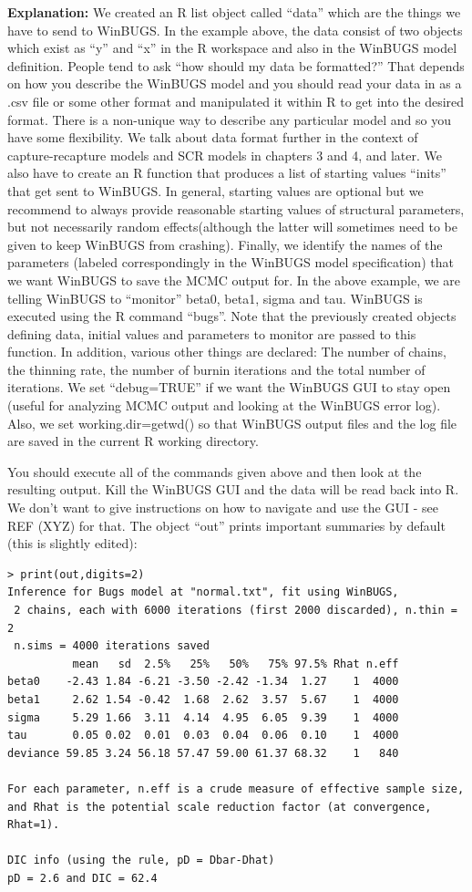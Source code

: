 {\bf Explanation:} We created an R list object called ``data'' which are the things we have to send to WinBUGS.  In the example above, the data consist of two objects which exist as ``y'' and ``x'' in the R workspace and also in the WinBUGS model definition.  People tend to ask ``how should my data be formatted?'' That depends on how you describe the WinBUGS model and you should read your data in as a .csv file or some other format and manipulated it within R to get into the desired format. There is a non-unique way to describe any particular model and so you have some flexibility. We talk about data format further in the context of capture-recapture models and SCR models in chapters 3 and 4, and later.  We also have to create an R function that produces a list of starting values ``inits'' that get sent to WinBUGS. In general, starting values are optional but we recommend to always provide reasonable starting values of structural parameters, but not necessarily random effects(although the latter will sometimes need to be given to keep WinBUGS from crashing).  Finally, we identify the names of the parameters (labeled correspondingly in the WinBUGS model specification) that we want WinBUGS to save the MCMC output for. In the above example, we are telling WinBUGS to ``monitor'' beta0, beta1, sigma and tau. WinBUGS is executed using the R command ``bugs''. Note that the previously created objects defining data, initial values and parameters to monitor are passed to this function. In addition, various other things are declared: The number of chains, the thinning rate, the number of burnin iterations and the total number of iterations. We set ``debug=TRUE'' if we want the WinBUGS GUI to stay open (useful for analyzing MCMC output and looking at the WinBUGS error log). Also, we set working.dir=getwd() so that WinBUGS output files and the log file are saved in the current R working directory.


You should execute all of the commands given above and then look at the resulting output. Kill the WinBUGS GUI and the data will be read back into R.  We don't want to give instructions on how to navigate and use the GUI - see REF (XYZ) for that.  The object ``out'' prints important summaries by default (this is slightly edited):

\begin{verbatim}
> print(out,digits=2)
Inference for Bugs model at "normal.txt", fit using WinBUGS,
 2 chains, each with 6000 iterations (first 2000 discarded), n.thin = 2
 n.sims = 4000 iterations saved
          mean   sd  2.5%   25%   50%   75% 97.5% Rhat n.eff
beta0    -2.43 1.84 -6.21 -3.50 -2.42 -1.34  1.27    1  4000
beta1     2.62 1.54 -0.42  1.68  2.62  3.57  5.67    1  4000
sigma     5.29 1.66  3.11  4.14  4.95  6.05  9.39    1  4000
tau       0.05 0.02  0.01  0.03  0.04  0.06  0.10    1  4000
deviance 59.85 3.24 56.18 57.47 59.00 61.37 68.32    1   840

For each parameter, n.eff is a crude measure of effective sample size,
and Rhat is the potential scale reduction factor (at convergence, Rhat=1).

DIC info (using the rule, pD = Dbar-Dhat)
pD = 2.6 and DIC = 62.4
\end{verbatim}

